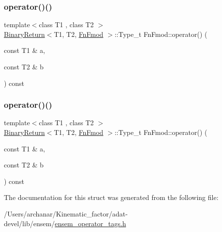 \mbox{\label{structFnFmod_a9eb37a001ef170a6ad8ce1fcc2feec5e}} 
\subsubsection{\texorpdfstring{operator()()}{operator()()}\hspace{0.1cm}{\footnotesize\ttfamily [2/3]}}
{\footnotesize\ttfamily template$<$class T1 , class T2 $>$ \\
\mbox{\hyperlink{structBinaryReturn}{Binary\+Return}}$<$T1, T2, \mbox{\hyperlink{structFnFmod}{Fn\+Fmod}} $>$\+::Type\+\_\+t Fn\+Fmod\+::operator() (\begin{DoxyParamCaption}\item[{const T1 \&}]{a,  }\item[{const T2 \&}]{b }\end{DoxyParamCaption}) const\hspace{0.3cm}{\ttfamily [inline]}}

\mbox{\label{structFnFmod_a9eb37a001ef170a6ad8ce1fcc2feec5e}} 
\subsubsection{\texorpdfstring{operator()()}{operator()()}\hspace{0.1cm}{\footnotesize\ttfamily [3/3]}}
{\footnotesize\ttfamily template$<$class T1 , class T2 $>$ \\
\mbox{\hyperlink{structBinaryReturn}{Binary\+Return}}$<$T1, T2, \mbox{\hyperlink{structFnFmod}{Fn\+Fmod}} $>$\+::Type\+\_\+t Fn\+Fmod\+::operator() (\begin{DoxyParamCaption}\item[{const T1 \&}]{a,  }\item[{const T2 \&}]{b }\end{DoxyParamCaption}) const\hspace{0.3cm}{\ttfamily [inline]}}



The documentation for this struct was generated from the following file\+:\begin{DoxyCompactItemize}
\item 
/\+Users/archanar/\+Kinematic\+\_\+factor/adat-\/devel/lib/ensem/\mbox{\hyperlink{adat-devel_2lib_2ensem_2ensem__operator__tags_8h}{ensem\+\_\+operator\+\_\+tags.\+h}}\end{DoxyCompactItemize}
